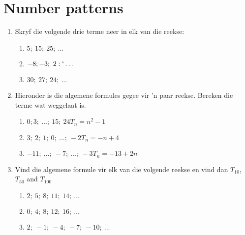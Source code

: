         \chapter{Number patterns}
\begin{exercises}{}
{ 
\begin{enumerate}[noitemsep, label=\textbf{\arabic*}. ] 
\item Skryf die volgende drie terme neer in elk van die reekse:
  \begin{enumerate} [noitemsep, label=\textbf{(\alph*)} ]
  \item $5;~15;~25;~\ldots$
  \item $-8;-3;~2:`\ldots$
  \item $30;~27;~24;~\ldots$
  \end{enumerate}
 \item Hieronder is die algemene formules gegee vir ’n paar reekse. Bereken die terme wat weggelaat is.
  \begin{enumerate} [noitemsep, label=\textbf{(\alph*)} ]
  \item $0;3;~\ldots;~15;~24$\hspace{2.2cm}$T_{n}={n}^{2}-1$
  \item $3;~2;~1;~0;~\ldots;~-2$\hspace{2cm}$T_{n}=-n+4$
  \item $-11;~\ldots;~-7;~\ldots;~-3$\hspace{1.5cm}$T_{n}=-13+2n$
  \end{enumerate}
\item Vind die algemene formule vir elk van die volgende reekse en vind dan ${T}_{10}$, ${T}_{50}$ and ${T}_{100}$
  \begin{enumerate}[noitemsep, label=\textbf{(\alph*)} ]
  \item $2;~5;~8;~11;~14;~\ldots$
  \item $0;~4;~8;~12;~16;~\ldots$
  \item $2;~-1;~-4;~-7;~-10;~\ldots$
  \end{enumerate}
\end{enumerate}

}%
\end{exercises}



